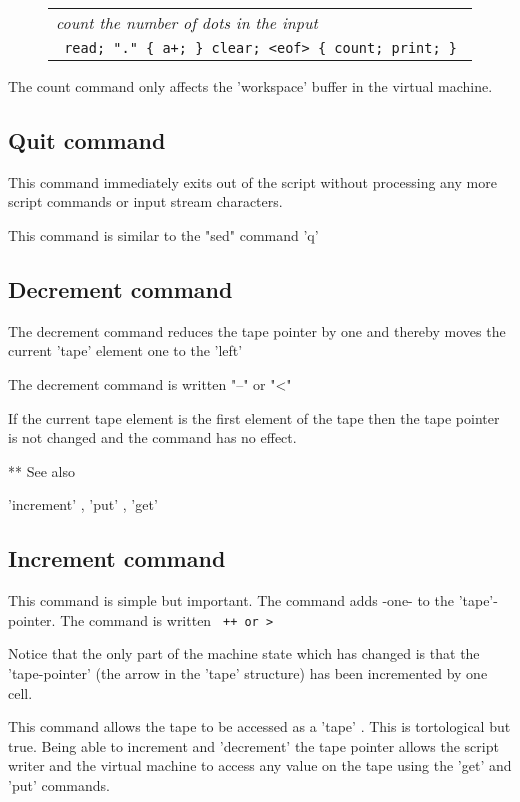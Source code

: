 \documentclass[a4paper,12pt]{article}
\begin{document}
 \begin{figure}
 \begin{tabular}{ l }
 \emph{ count the number of dots in the input  } \\ 
 \verb| read; "." { a+; } clear; <eof> { count; print; } |
 \end{tabular} 
 \end{figure}
  
 The count command only affects the 'workspace' buffer in the virtual
 machine.

\subsection{Quit command}

  This command immediately exits out of the script without
  processing any more script commands or input stream characters.
  
  This command is similar to the "sed" command 'q'

\subsection{Decrement command}

 The decrement command reduces the tape pointer by
 one and thereby moves the current 'tape' element one
 to the 'left'
 
 The decrement command is written "--" or "<"

 If the current tape element is the first element of
 the tape then the tape pointer is not changed and the
 command has no effect.

 ** See also

  'increment' , 'put' , 'get'

\subsection{Increment command}

 This command is simple but important. The command
 adds -one- to the 'tape'-pointer. The command is written 
 \verb| ++ or > |


 Notice that the only part of the machine state which has
 changed is that the 'tape-pointer' (the arrow in the 'tape'
 structure) has been incremented by one cell.
  
 This command allows the tape to be accessed as a 'tape' . This is
 tortological but true. Being able to increment and 'decrement' the tape
 pointer allows the script writer and the virtual machine to access any value
 on the tape using the 'get' and 'put' commands.
 
\end{document}

